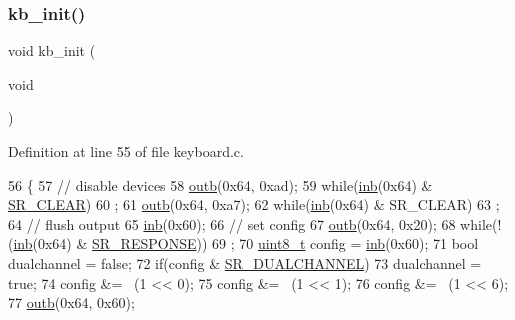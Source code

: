 \subsubsection{\texorpdfstring{kb\+\_\+init()}{kb\_init()}}
{\footnotesize\ttfamily void kb\+\_\+init (\begin{DoxyParamCaption}\item[{void}]{ }\end{DoxyParamCaption})}



Definition at line 55 of file keyboard.\+c.


\begin{DoxyCode}
56 \{
57     \textcolor{comment}{// disable devices}
58     \hyperlink{a00158_aa37f5841c54156a4b14fc0d6f626b44f_aa37f5841c54156a4b14fc0d6f626b44f}{outb}(0x64, 0xad);
59     \textcolor{keywordflow}{while}(\hyperlink{a00158_a0223c8898dfec29069879dc51076e28a_a0223c8898dfec29069879dc51076e28a}{inb}(0x64) & \hyperlink{a00032_a8aa66e8bc828742fb4819d7cd2df598d_a8aa66e8bc828742fb4819d7cd2df598d}{SR\_CLEAR})
60         ;
61     \hyperlink{a00158_aa37f5841c54156a4b14fc0d6f626b44f_aa37f5841c54156a4b14fc0d6f626b44f}{outb}(0x64, 0xa7);
62     \textcolor{keywordflow}{while}(\hyperlink{a00158_a0223c8898dfec29069879dc51076e28a_a0223c8898dfec29069879dc51076e28a}{inb}(0x64) & SR\_CLEAR)
63         ;
64     \textcolor{comment}{// flush output}
65     \hyperlink{a00158_a0223c8898dfec29069879dc51076e28a_a0223c8898dfec29069879dc51076e28a}{inb}(0x60);
66     \textcolor{comment}{// set config}
67     \hyperlink{a00158_aa37f5841c54156a4b14fc0d6f626b44f_aa37f5841c54156a4b14fc0d6f626b44f}{outb}(0x64, 0x20);
68     \textcolor{keywordflow}{while}(!(\hyperlink{a00158_a0223c8898dfec29069879dc51076e28a_a0223c8898dfec29069879dc51076e28a}{inb}(0x64) & \hyperlink{a00032_ac9efa716f8185bae296975136b510c30_ac9efa716f8185bae296975136b510c30}{SR\_RESPONSE}))
69         ;
70     \hyperlink{a00134_aba7bc1797add20fe3efdf37ced1182c5_aba7bc1797add20fe3efdf37ced1182c5}{uint8\_t} config = \hyperlink{a00158_a0223c8898dfec29069879dc51076e28a_a0223c8898dfec29069879dc51076e28a}{inb}(0x60);
71     \textcolor{keywordtype}{bool} dualchannel = \textcolor{keyword}{false};
72     \textcolor{keywordflow}{if}(config & \hyperlink{a00032_addafe32b109f94a57ae4bf1a1dca05e0_addafe32b109f94a57ae4bf1a1dca05e0}{SR\_DUALCHANNEL})
73         dualchannel = \textcolor{keyword}{true};
74     config &= ~(1 << 0);
75     config &= ~(1 << 1);
76     config &= ~(1 << 6);
77     \hyperlink{a00158_aa37f5841c54156a4b14fc0d6f626b44f_aa37f5841c54156a4b14fc0d6f626b44f}{outb}(0x64, 0x60);

\end{DoxyCode}
